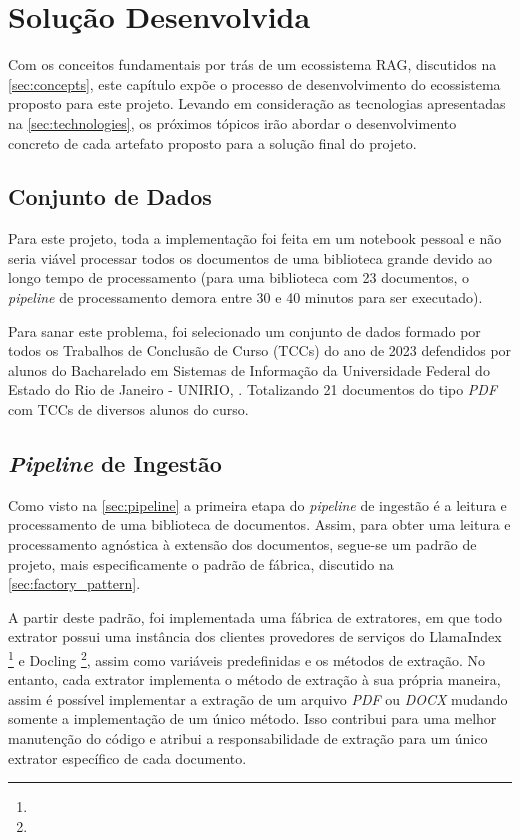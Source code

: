 \documentclass[a4paper, 12pt]{article}
\newcommand{\citeb}[1]{\bibleftbracket\cite{#1}\bibrightbracket}
\begin{document}
    \clearpage

    \section{Solução Desenvolvida}

    Com os conceitos fundamentais por trás de um ecossistema RAG, discutidos na \autoref{sec:concepts}, este capítulo expõe o processo de desenvolvimento do ecossistema proposto para este projeto. Levando em consideração as tecnologias apresentadas na \autoref{sec:technologies}, os próximos tópicos irão abordar o desenvolvimento concreto de cada artefato proposto para a solução final do projeto.

    \subsection{Conjunto de Dados} \label{sec:data}

    Para este projeto, toda a implementação foi feita em um notebook pessoal e não seria viável processar todos os documentos de uma biblioteca grande devido ao longo tempo de processamento (para uma biblioteca com 23 documentos, o \textit{pipeline} de processamento demora entre 30 e 40 minutos para ser executado). 
    
    Para sanar este problema, foi selecionado um conjunto de dados formado por todos os Trabalhos de Conclusão de Curso (TCCs) do ano de 2023 defendidos por alunos do Bacharelado em Sistemas de Informação da Universidade Federal do Estado do Rio de Janeiro - UNIRIO, \citeb{tccs_unirio}. Totalizando 21 documentos do tipo \textit{PDF} com TCCs de diversos alunos do curso.


    \subsection{\textit{Pipeline} de Ingestão}
    
    Como visto na \autoref{sec:pipeline} a primeira etapa do \textit{pipeline} de ingestão é a leitura e processamento de uma biblioteca de documentos. Assim, para obter uma leitura e processamento agnóstica à extensão dos documentos, segue-se  um padrão de projeto, mais especificamente o padrão de fábrica, discutido na \autoref{sec:factory_pattern}.

    A partir deste padrão, foi implementada uma fábrica de extratores, em que todo extrator possui uma instância dos clientes provedores de serviços do LlamaIndex \footnote{} e Docling \footnote{}, assim como variáveis predefinidas e os métodos de extração. No entanto, cada extrator implementa o método de extração à sua própria maneira, assim é possível implementar a extração de um arquivo \textit{PDF} ou \textit{DOCX} mudando somente a implementação de um único método. Isso contribui para uma melhor manutenção do código e atribui a responsabilidade de extração para um único extrator específico de cada documento.
\end{document}
